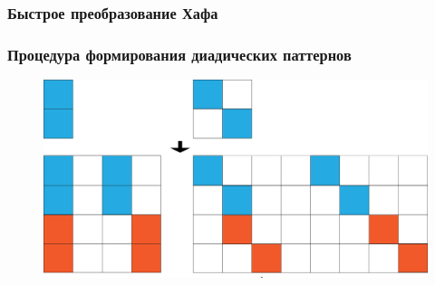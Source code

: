 \documentclass[12pt]{beamer}
\begin{document}
\begin{frame}
\frametitle{Быстрое преобразование Хафа}
\frametitle{Процедура формирования диадических паттернов}
  \begin{figure}
  \centering
    \includegraphics[width=1\textwidth]{../Dissertation/images/part1_img/hough_proc}
  \end{figure}
\end{frame}
\end{document}
